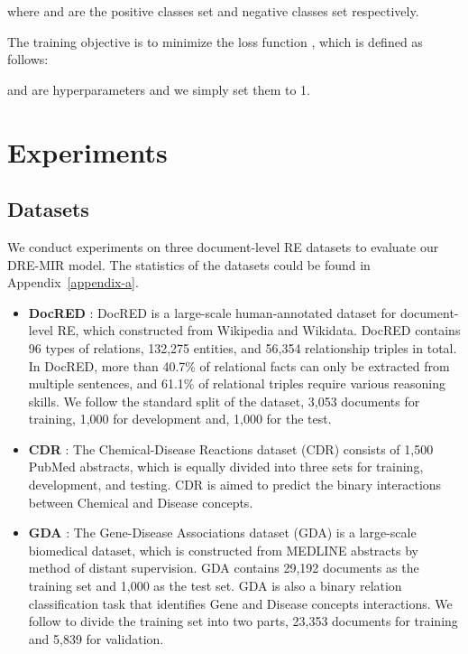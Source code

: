\documentclass{article}
\begin{document}
where  and  are the positive classes set and negative classes set respectively.

The training objective is to minimize the loss function , which is defined as follows:

 and  are hyperparameters and we simply set them to 1.

\section{Experiments}
\subsection{Datasets}
We conduct experiments on three document-level RE datasets to evaluate our DRE-MIR model. 
The statistics of the datasets could be found in Appendix~\ref{appendix-a}.
\begin{itemize}
\item \textbf{DocRED} \cite{c:8}:
DocRED is a large-scale human-annotated dataset for document-level RE, which constructed from Wikipedia and Wikidata. 
DocRED contains 96 types of relations, 132,275 entities, and 56,354 relationship triples in total. 
In DocRED, more than 40.7\% of relational facts can only be extracted from multiple sentences, and 61.1\% of relational triples require various reasoning skills. 
We follow the standard split of the dataset, 3,053 documents for training, 1,000 for development and, 1,000 for the test.
\item \textbf{CDR} \cite{c:26}:
The Chemical-Disease Reactions dataset (CDR) consists of 1,500 PubMed abstracts, which is equally divided into three sets for training, development, and testing. CDR is aimed to predict the binary interactions between Chemical and Disease concepts. 
\item \textbf{GDA} \cite{c:27}:
The Gene-Disease Associations dataset (GDA) is a large-scale biomedical dataset, which is constructed from MEDLINE abstracts by method of distant supervision.
GDA contains 29,192 documents as the training set and 1,000 as the test set. 
GDA is also a binary relation classification task that identifies Gene and Disease concepts interactions. We follow \cite{c:15} to divide the training set into two parts, 23,353 documents for training and 5,839 for validation.
\end{itemize}
\end{document}
